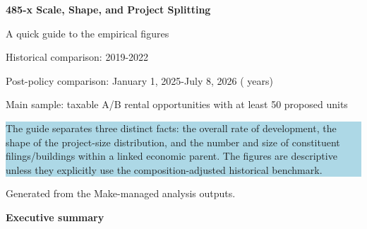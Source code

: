 \documentclass[10pt]{article}
\begin{document}
\thispagestyle{empty}
\vspace*{0.55in}
{\color{navy}\fontsize{28}{32}\selectfont\bfseries
485-x Scale, Shape, and Project Splitting\par}
\vspace{0.12in}
{\fontsize{18}{22}\selectfont A quick guide to the empirical figures\par}
\vspace{0.30in}
{\large
Historical comparison: 2019-2022\par
Post-policy comparison: January 1, 2025-July 8, 2026 (\PostExposureYears{} years)\par
Main sample: taxable A/B rental opportunities with at least 50 proposed units\par}

\vfill
\colorbox{lightblue}{
  \begin{minipage}{0.93\textwidth}
    \large
    The guide separates three distinct facts: the overall rate of development,
    the shape of the project-size distribution, and the number and size of
    constituent filings/buildings within a linked economic parent. The figures
    are descriptive unless they explicitly use the composition-adjusted
    historical benchmark.
  \end{minipage}
}
\vfill
{\small Generated from the Make-managed analysis outputs.}

\clearpage
{\color{navy}\LARGE\bfseries Executive summary}\par\vspace{10pt}
\end{document}
